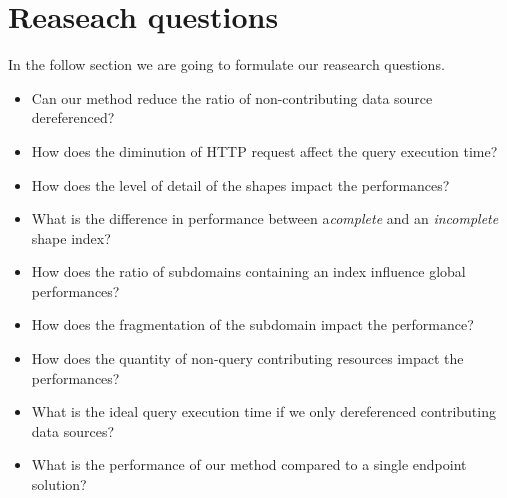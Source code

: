 \section{Reaseach questions}
In the follow section we are going to formulate our reasearch questions.

\begin{itemize}
    \item Can our method reduce the ratio of non-contributing data source dereferenced?
    \item How does the diminution of HTTP request affect the query execution time?
    
    \item How does the level of detail of the shapes impact the performances?
    \item What is the difference in performance between a\emph{complete} and an \emph{incomplete} shape index?
    \item How does the ratio of subdomains containing an index influence global performances?
    \item How does the fragmentation of the subdomain impact the performance?
    
    \item How does the quantity of non-query contributing resources impact the performances?

    \item What is the ideal query execution time if we only dereferenced contributing data sources?
    \item What is the performance of our method compared to a single endpoint solution?
\end{itemize}
